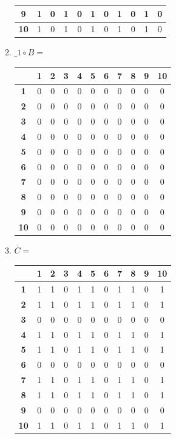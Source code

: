 \documentclass[a4paper,14pt]{extarticle}
\begin{document}
\begin{enumerate}[label=1.\arabic*.]
\begin{enumerate}[1) ]
\begin{tabular}{|c|c|c|c|c|c|c|c|c|c|c|}
		\hline\textbf{9}&1&0&1&0&1&0&1&0&1&0\\
		\hline\textbf{10}&1&0&1&0&1&0&1&0&1&0\\
		\hline
	\end{tabular}
\item $\_1 \circ B = $  \begin{tabular}{|c|c|c|c|c|c|c|c|c|c|c|}
	\hline
	&\textbf{1}&\textbf{2}&\textbf{3}&\textbf{4}&\textbf{5}&\textbf{6}&\textbf{7}&\textbf{8}&\textbf{9}&\textbf{10}\\
	\hline\textbf{1}&0&0&0&0&0&0&0&0&0&0\\
	\hline\textbf{2}&0&0&0&0&0&0&0&0&0&0\\
	\hline\textbf{3}&0&0&0&0&0&0&0&0&0&0\\
	\hline\textbf{4}&0&0&0&0&0&0&0&0&0&0\\
	\hline\textbf{5}&0&0&0&0&0&0&0&0&0&0\\
	\hline\textbf{6}&0&0&0&0&0&0&0&0&0&0\\
	\hline\textbf{7}&0&0&0&0&0&0&0&0&0&0\\
	\hline\textbf{8}&0&0&0&0&0&0&0&0&0&0\\
	\hline\textbf{9}&0&0&0&0&0&0&0&0&0&0\\
	\hline\textbf{10}&0&0&0&0&0&0&0&0&0&0\\
	\hline
	
\end{tabular}
\item $\overline{C} = $  \begin{tabular}{|c|c|c|c|c|c|c|c|c|c|c|}
	\hline
	&\textbf{1}&\textbf{2}&\textbf{3}&\textbf{4}&\textbf{5}&\textbf{6}&\textbf{7}&\textbf{8}&\textbf{9}&\textbf{10}\\
	\hline\textbf{1}&1&1&0&1&1&0&1&1&0&1\\
	\hline\textbf{2}&1&1&0&1&1&0&1&1&0&1\\
	\hline\textbf{3}&0&0&0&0&0&0&0&0&0&0\\
	\hline\textbf{4}&1&1&0&1&1&0&1&1&0&1\\
	\hline\textbf{5}&1&1&0&1&1&0&1&1&0&1\\
	\hline\textbf{6}&0&0&0&0&0&0&0&0&0&0\\
	\hline\textbf{7}&1&1&0&1&1&0&1&1&0&1\\
	\hline\textbf{8}&1&1&0&1&1&0&1&1&0&1\\
	\hline\textbf{9}&0&0&0&0&0&0&0&0&0&0\\
	\hline\textbf{10}&1&1&0&1&1&0&1&1&0&1\\
	\hline
	

\end{tabular}
\end{enumerate}
\end{enumerate}
\end{document}
